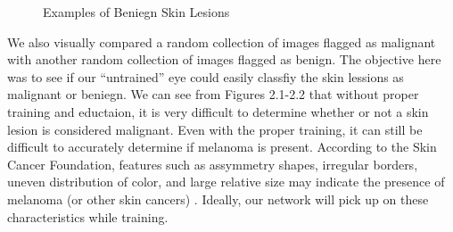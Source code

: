 \documentclass [MAS] {uclathes}
\begin{document}
\begin{figure}[hbt!]
\hspace*{\fill}
\centering
{}\hspace{0.5em}
\hspace{0.5em}
\hspace*{\fill}
\label{fig:ben_examples}
\vspace{-1cm}
\caption{Examples of Beniegn Skin Lesions}
\end{figure}


We also visually compared a random collection of images flagged as malignant with another random collection of images flagged as benign. The objective here was to see if our ``untrained'' eye could easily classfiy the skin lessions as malignant or beniegn. We can see from Figures 2.1-2.2 that without proper training and eductaion, it is very difficult to determine whether or not a skin lesion is considered malignant. Even with the proper training, it can still be difficult to accurately determine if melanoma is present. According to the Skin Cancer Foundation, features such as assymmetry shapes, irregular borders, uneven distribution of color, and large relative size may indicate the presence of melanoma (or other skin cancers) \cite{SCF}. Ideally, our network will pick up on these characteristics while training.
\end{document}
